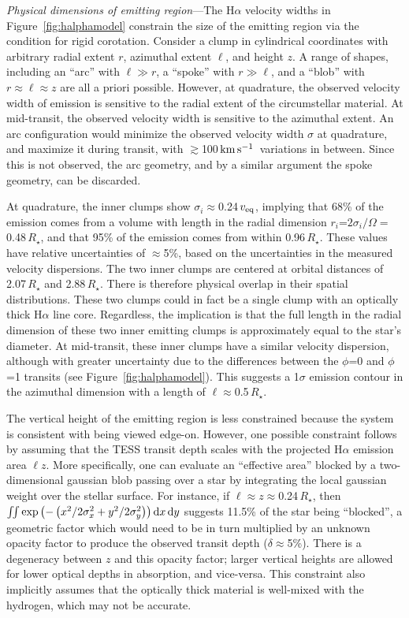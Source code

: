 \documentclass[11pt,twocolumn,tighten]{aastex7}
\newcommand{\kms}{\ensuremath{\rm km\,s^{-1}}}
\begin{document}
{\it Physical dimensions of emitting region}---The H$\alpha$
velocity widths in Figure~\ref{fig:halphamodel} constrain
the size of the emitting region via the condition for rigid
corotation.  Consider a clump in cylindrical coordinates with
arbitrary radial extent $r$, azimuthal extent $\ell$, and height $z$.
A range of shapes, including an ``arc'' with $\ell \gg r$, a ``spoke''
with $r \gg \ell$, and a ``blob'' with $r \approx \ell \approx z$ are
all a priori possible.  However, at quadrature, the observed velocity
width of emission is sensitive to the radial extent of the
circumstellar material.  At mid-transit, the observed velocity width
is sensitive to the azimuthal extent.  An arc configuration would
minimize the observed velocity width $\sigma$ at quadrature, and
maximize it during transit, with $\gtrsim$100\,\kms\ variations in
between.  Since this is not observed, the arc geometry, and by a similar
argument the spoke geometry, can be discarded.  

At quadrature, the inner clumps show $\sigma_i$$\approx$0.24\,$v_{\rm
eq}$, implying that 68\% of the emission comes from a volume with
length in the radial dimension $r_i$=$2\sigma_i /
\Omega$$=$0.48\,$R_\star$, and that 95\% of the emission comes from
within 0.96\,$R_\star$.  These values have relative uncertainties of
$\approx$5\%, based on the uncertainties in the measured velocity
dispersions.  The two inner clumps are centered at orbital distances
of 2.07\,$R_\star$ and 2.88\,$R_\star$.  There is therefore physical
overlap in their spatial distributions.  These two clumps could in
fact be a single clump with an optically thick H$\alpha$ line core.
Regardless, the implication is that the full length in the radial
dimension of these two inner emitting clumps is approximately equal to
the star's diameter.  At mid-transit, these
inner clumps have a similar velocity dispersion, although with
greater uncertainty due to the differences between the $\phi$=0 and
$\phi$=1 transits (see Figure~\ref{fig:halphamodel}).
This suggests a 1$\sigma$ emission contour in the azimuthal dimension
with a length of $\ell$$\approx$0.5\,$R_\star$.

The vertical height of the emitting region is less constrained because
the system is consistent with being viewed edge-on.  However, one
possible constraint follows by assuming that the TESS transit depth scales
with the projected H$\alpha$ emission area $\ell z$.  
More specifically, one can evaluate an ``effective area'' blocked by a
two-dimensional gaussian blob passing over a star by integrating the
local gaussian weight over the stellar surface.  For instance, if
$\ell$$\approx$$z$$\approx$0.24\,$R_\star$, then
$\iint \exp \left(
  -\left( x^2/2\sigma_x^2 + y^2/2\sigma_y^2 \right)
\right) {\rm d}x \, {\rm d}y$
suggests 11.5\% of the star being ``blocked'', a geometric factor
which would need to be in turn multiplied by an unknown opacity factor
to produce the observed transit depth ($\delta$$\approx$5\%).  
There is a degeneracy between $z$ and this opacity
factor; larger vertical heights are allowed for lower optical depths
in absorption, and vice-versa.  This constraint also implicitly
assumes that the optically thick material is well-mixed with the
hydrogen, which may not be accurate.
\end{document}
